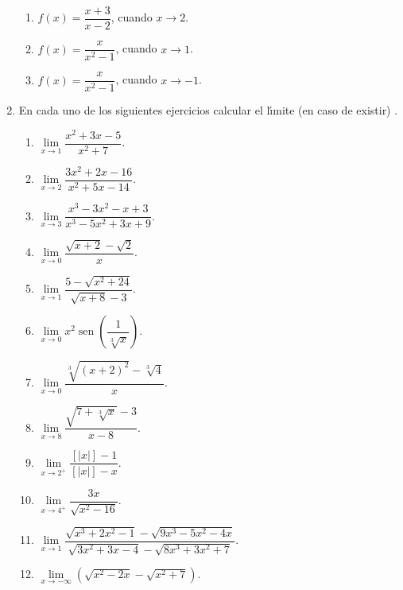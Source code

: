 \begin{enumerate}
\begin{enumerate}
\item $f(x)=\dfrac{x+3}{x-2}$, cuando $x\rightarrow2$.

\item $f(x)=\dfrac{x}{x^{2}-1}$, cuando $x\rightarrow1$.

\item $f(x)=\dfrac{x}{x^{2}-1}$, cuando $x\rightarrow-1$.
\end{enumerate}

\item En cada uno de los siguientes ejercicios calcular el l\'{\i}mite (en
caso de existir) .

\begin{enumerate}
\item $\lim\limits_{x\rightarrow1}\dfrac{x^{2}+3x-5}{x^{2}+7}.$

\item $\lim\limits_{x\rightarrow2}\dfrac{3x^{2}+2x-16}{x^{2}+5x-14}.$

\item $\lim\limits_{x\rightarrow3}\dfrac{x^{3}-3x^{2}-x+3}{x^{3}-5x^{2}%
+3x+9}.$

\item $\lim\limits_{x\rightarrow0}\dfrac{\sqrt{x+2}-\sqrt{2}}{x}.$

\item $\lim\limits_{x\rightarrow1}\dfrac{5-\sqrt{x^{2}+24}}{\sqrt{x+8}-3}.$

\item $\lim\limits_{x\rightarrow0}x^{2}\operatorname{sen}\left(  \dfrac
{1}{\sqrt[3]{x}}\right)  .$

\item $\lim\limits_{x\rightarrow0}\dfrac{\sqrt[3]{\left(  x+2\right)  ^{2}%
}-\sqrt[3]{4}}{x}.$

\item $\lim\limits_{x\rightarrow8}\dfrac{\sqrt{7+\sqrt[3]{x}}-3}{x-8}.$

\item $\lim\limits_{x\rightarrow2^{+}}\dfrac{\left[  \left\vert x\right\vert
\right]  -1}{\left[  \left\vert x\right\vert \right]  -x}.$

\item $\lim\limits_{x\rightarrow4^{+}}\dfrac{3x}{\sqrt{x^{2}-16}}.$

\item $\lim\limits_{x\rightarrow1}\dfrac{\sqrt{x^{3}+2x^{2}-1}-\sqrt
{9x^{3}-5x^{2}-4x}}{\sqrt{3x^{2}+3x-4}-\sqrt{8x^{3}+3x^{2}+7}}.$

\item $\lim\limits_{x\rightarrow-\infty}\left(  \sqrt{x^{2}-2x}-\sqrt{x^{2}%
+7}\right)  .$


\end{enumerate}
\end{enumerate}
